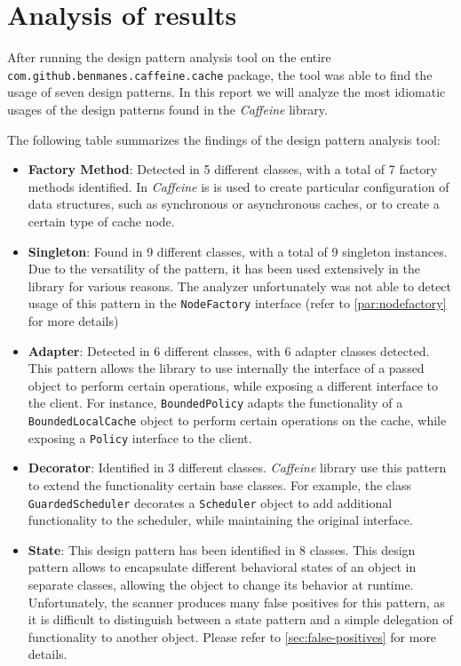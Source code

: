 \section{Analysis of results}

After running the design pattern analysis tool on the entire \texttt{com.github.benmanes.caffeine.cache} package, the tool was able to find the usage of seven design patterns. In this report we will analyze the most idiomatic usages of the design patterns found in the \textit{Caffeine} library.

The following table summarizes the findings of the design pattern analysis tool:

\begin{itemize}
	\item \textbf{Factory Method}: Detected in 5 different classes, with a total of 7 factory methods identified. In \textit{Caffeine} is is used to create particular configuration of data structures, such as synchronous or asynchronous caches, or to create a certain type of cache node.

	\item \textbf{Singleton}: Found in 9 different classes, with a total of 9 singleton instances. Due to the versatility of the pattern, it has been used extensively in the library for various reasons. The analyzer unfortunately was not able to detect usage of this pattern in the \texttt{NodeFactory} interface (refer to \autoref{par:nodefactory} for more details)

	\item \textbf{Adapter}: Detected in 6 different classes, with 6 adapter classes detected. This pattern allows the library to use internally the interface of a passed object to perform certain operations, while exposing a different interface to the client. For instance, \texttt{BoundedPolicy} adapts the functionality of a \texttt{BoundedLocalCache} object to perform certain operations on the cache, while exposing a \texttt{Policy} interface to the client.

	\item \textbf{Decorator}: Identified in 3 different classes. \textit{Caffeine} library use this pattern to extend the functionality certain base classes. For example, the class \texttt{GuardedScheduler} decorates a \texttt{Scheduler} object to add additional functionality to the scheduler, while maintaining the original interface.

	\item \textbf{State}: This design pattern has been identified in 8 classes. This design pattern allows to encapsulate different behavioral states of an object in separate classes, allowing the object to change its behavior at runtime. Unfortunately, the scanner produces many false positives for this pattern, as it is difficult to distinguish between a state pattern and a simple delegation of functionality to another object. Please refer to \autoref{sec:false-positives} for more details.


\end{itemize}
